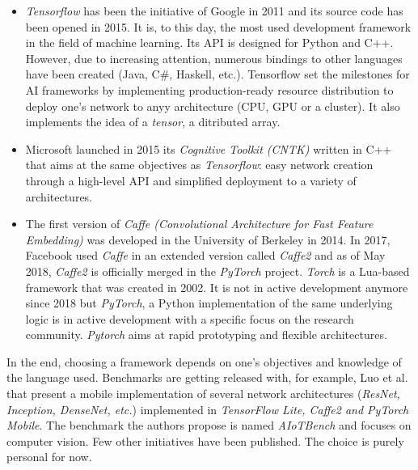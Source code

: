 \begin{itemize}
  \item \emph{Tensorflow} has been the initiative of Google in 2011 and its source code has been opened in 2015. It is, to this day, the most used development framework in the field of machine learning. Its API is designed for Python and C++. However, due to increasing attention, numerous bindings to other languages have been created (Java, C\#, Haskell, etc.). Tensorflow set the milestones for AI frameworks by implementing production-ready resource distribution to deploy one's network to anyy architecture (CPU, GPU or a cluster). It also implements the idea of a \emph{tensor}, a ditributed array.
  \item Microsoft launched in 2015 its \emph{Cognitive Toolkit (CNTK)} written in C++ that aims at the same objectives as \emph{Tensorflow}: easy network creation through a high-level API and simplified deployment to a variety of architectures.
  \item The first version of \emph{Caffe (Convolutional Architecture for Fast Feature Embedding)} was developed in the University of Berkeley in 2014. In 2017, Facebook used \emph{Caffe} in an extended version called \emph{Caffe2} and as of May 2018, \emph{Caffe2} is officially merged in the \emph{PyTorch} project.
  \emph{Torch} is a Lua-based framework that was created in 2002. It is not in active development anymore since 2018 but \emph{PyTorch}, a Python implementation of the same underlying logic is in active development with a specific focus on the research community. \emph{Pytorch} aims at rapid prototyping and flexible architectures.
\end{itemize}

In the end, choosing a framework depends on one's objectives and knowledge of the language used. Benchmarks are getting released with, for example, Luo et al. \cite{Luo2020} that present a mobile implementation of several network architectures (\emph{ResNet, Inception, DenseNet, etc.}) implemented in \emph{TensorFlow Lite, Caffe2 and PyTorch Mobile}. The benchmark the authors propose is named \emph{AIoTBench} and focuses on computer vision. Few other initiatives have been published. The choice is purely personal for now.



